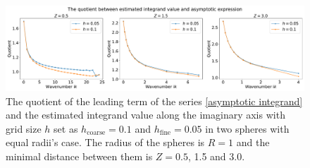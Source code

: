 \begin{figure}[H]
    \centering
    \hspace*{-1.4cm}\includegraphics[scale = 0.37]{figures/rel_err_equal.pdf}
    \caption{The quotient of the leading term of the series \eqref{asymptotic integrand} and the estimated integrand value along the imaginary axis
    with grid size $h$ set as $h_{\text{coarse}} = 0.1$ and $ h_{\text{fine}} = 0.05$ in two spheres with equal radii's case. The radius of the spheres is $R = 1$ and the minimal distance between them is $Z = 0.5$, 1.5 and 3.0. }
    \label{Abs equal}
\end{figure}

